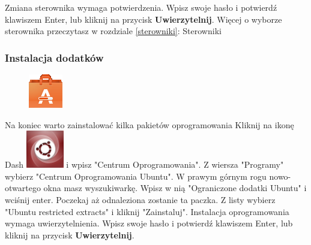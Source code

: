 Zmiana sterownika wymaga potwierdzenia. Wpisz swoje hasło i potwierdź klawiszem Enter, lub kliknij na przycisk \textbf{Uwierzytelnij}. Więcej o wyborze sterownika przeczytasz w rozdziale \ref{sterowniki}: Sterowniki
\clearpage
\subsubsection{Instalacja dodatków}
\begin{figure}
        \includegraphics[width=\linewidth]{images/pierwsze_uruchomienie_dodatki1.png}
\end{figure}
Na koniec warto zainstalować kilka pakietów oprogramowania Kliknij na ikonę Dash \includegraphics[scale=0.35]{images/ikony_dash.png} i wpisz "Centrum Oprogramowania". Z wiersza "Programy" wybierz "Centrum Oprogramowania Ubuntu". W prawym górnym rogu nowo-otwartego okna masz wyszukiwarkę. Wpisz w nią "Ograniczone dodatki Ubuntu" i wciśnij enter. Poczekaj aż odnaleziona zostanie ta paczka. Z listy wybierz "Ubuntu restricted extracts" i kliknij "Zainstaluj". Instalacja oprogramowania wymaga uwierzytelnienia. Wpisz swoje hasło i potwierdź klawiszem Enter, lub kliknij na przycisk \textbf{Uwierzytelnij}.
